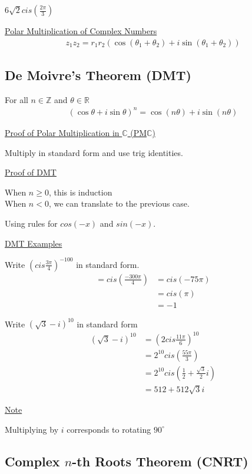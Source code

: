 \documentclass{article}
\begin{document}
$6\sqrt{2}cis(\frac{2\pi}{3})$

\underline{Polar Multiplication of Complex Numbers}
\begin{align*}
    z_1z_2 = r_1r_2(\cos(\theta_1 + \theta_2) + i\sin(\theta_1 + \theta_2))
\end{align*}

\subsection{De Moivre's Theorem (DMT)}

For all $n \in \mathbb{Z}$ and $\theta \in \mathbb{R}$\\
\begin{align*}
    (\cos\theta + i\sin\theta)^n = \cos(n\theta) + i\sin(n\theta)
\end{align*}

\underline{Proof of Polar Multiplication in $\mathbb{C}$ (PM$\mathbb{C}$)}

Multiply in standard form and use trig identities.

\underline{Proof of DMT}

When $n \ge 0$, this is induction\\
When $n < 0$, we can translate to the previous case. 

Using rules for $cos(-x)$ and $sin(-x)$.

\underline{DMT Examples}

Write $(cis\frac{3\pi}{4})^{-100}$ in standard form.
\begin{align*}
    = cis(\frac{-300\pi}{4}) &= cis(-75\pi) \\
    &= cis(\pi) \\
    &= -1
\end{align*}

Write $(\sqrt{3}-i)^{10}$ in standard form
\begin{align*}
    (\sqrt{3}-i)^{10} &= (2cis\frac{11\pi}{6})^{10}\\
    &= 2^{10}cis(\frac{55\pi}{3}) \\
    &= 2^{10}cis(\frac{1}{2} + \frac{\sqrt{3}}{2}i)\\
    &= 512 + 512\sqrt{3}i
\end{align*}

\underline{Note}

Multiplying by $i$ corresponds to rotating $90^\circ$

\subsection{Complex $n$-th Roots Theorem (CNRT)}
\end{document}
